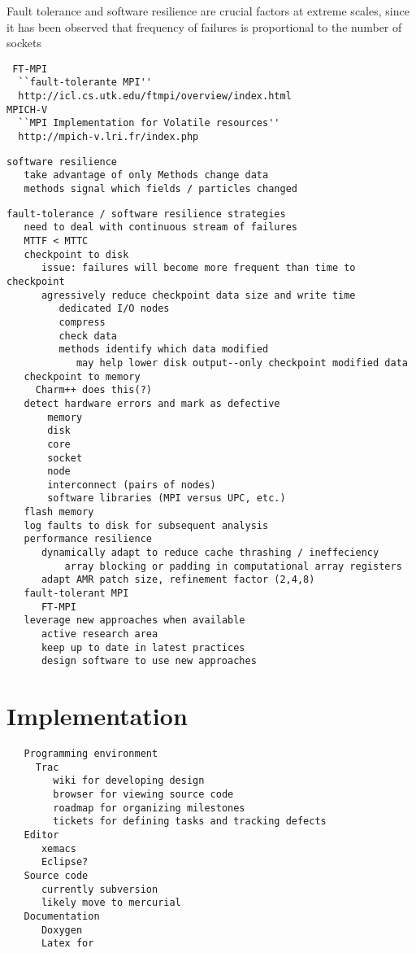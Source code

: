\documentclass[10pt]{article}
\begin{document}
 Fault tolerance and software
resilience are crucial factors at extreme scales, since it has been
observed that frequency of failures is proportional to the number of
sockets~\cite{@@@}

\begin{verbatim}
 FT-MPI 
  ``fault-tolerante MPI''
  http://icl.cs.utk.edu/ftmpi/overview/index.html 
MPICH-V 
  ``MPI Implementation for Volatile resources''
  http://mpich-v.lri.fr/index.php 
\end{verbatim}


\begin{verbatim}
software resilience
   take advantage of only Methods change data
   methods signal which fields / particles changed
\end{verbatim}
\begin{verbatim}
fault-tolerance / software resilience strategies
   need to deal with continuous stream of failures
   MTTF < MTTC
   checkpoint to disk
      issue: failures will become more frequent than time to checkpoint
      agressively reduce checkpoint data size and write time
         dedicated I/O nodes
         compress
         check data
         methods identify which data modified
            may help lower disk output--only checkpoint modified data
   checkpoint to memory
     Charm++ does this(?)
   detect hardware errors and mark as defective
       memory
       disk
       core
       socket
       node
       interconnect (pairs of nodes)
       software libraries (MPI versus UPC, etc.)
   flash memory
   log faults to disk for subsequent analysis
   performance resilience
      dynamically adapt to reduce cache thrashing / ineffeciency
          array blocking or padding in computational array registers
      adapt AMR patch size, refinement factor (2,4,8)
   fault-tolerant MPI
      FT-MPI
   leverage new approaches when available
      active research area
      keep up to date in latest practices
      design software to use new approaches
\end{verbatim}


\section{Implementation} \label{s:implementation}


\begin{verbatim}
   Programming environment
     Trac
        wiki for developing design
        browser for viewing source code
        roadmap for organizing milestones
        tickets for defining tasks and tracking defects
   Editor
      xemacs
      Eclipse?
   Source code     
      currently subversion
      likely move to mercurial
   Documentation
      Doxygen
      Latex for 
\end{verbatim}
\end{document}
